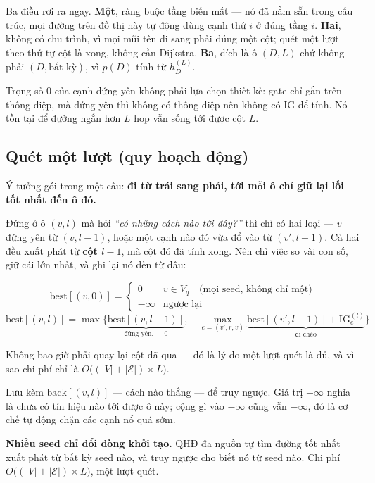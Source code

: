 \documentclass[11pt,a4paper]{article}
\newcommand{\best}{\mathrm{best}}
\begin{document}
Ba điều rơi ra ngay. \textbf{Một}, ràng buộc tầng biến mất --- nó đã nằm sẵn trong cấu trúc,
mọi đường trên đồ thị này tự động dùng cạnh thứ $i$ ở đúng tầng $i$. \textbf{Hai}, không có
chu trình, vì mọi mũi tên đi sang phải đúng một cột; quét một lượt theo thứ tự cột là xong,
không cần Dijkstra. \textbf{Ba}, đích là ô $(D,L)$ chứ không phải $(D,\text{bất kỳ})$, vì
$p(D)$ tính từ $h_D^{(L)}$.

Trọng số 0 của cạnh đứng yên không phải lựa chọn thiết kế: gate chỉ gắn trên thông điệp, mà
đứng yên thì không có thông điệp nên không có IG để tính. Nó tồn tại để đường ngắn hơn $L$
hop vẫn sống tới được cột $L$.

\subsection{Quét một lượt (quy hoạch động)}\label{sec:dp}

Ý tưởng gói trong một câu: \textbf{đi từ trái sang phải, tới mỗi ô chỉ giữ lại lối tốt nhất
đến ô đó.}

Đứng ở ô $(v,l)$ mà hỏi \emph{``có những cách nào tới đây?''} thì chỉ có hai loại --- $v$
đứng yên từ $(v,l-1)$, hoặc một cạnh nào đó vừa đổ vào từ $(v',l-1)$. Cả hai đều xuất phát
từ \textbf{cột $l-1$}, mà cột đó đã tính xong. Nên chỉ việc so vài con số, giữ cái lớn nhất,
và ghi lại nó đến từ đâu:

\[ \best[(v,0)]=\begin{cases}0 & v\in V_q \quad\text{(mọi seed, không chỉ một)}\\
                             -\infty & \text{ngược lại}\end{cases} \]
\[ \best[(v,l)]=\max\Big\{\underbrace{\best[(v,l-1)]}_{\text{đứng yên, }+0},\quad
   \max_{e=(v',r,v)}\underbrace{\best[(v',l-1)]+\mathrm{IG}_e^{(l)}}_{\text{đi chéo}}\Big\} \]

Không bao giờ phải quay lại cột đã qua --- đó là lý do một lượt quét là đủ, và vì sao chi
phí chỉ là $O\big((|V|+|\mathcal{E}|)\times L\big)$.

Lưu kèm $\mathrm{back}[(v,l)]$ --- cách nào thắng --- để truy ngược. Giá trị $-\infty$ nghĩa là chưa có tín hiệu nào tới được ô này; cộng gì vào $-\infty$ cũng vẫn $-\infty$, đó là cơ chế tự động chặn các cạnh nổ quá sớm.

\textbf{Nhiều seed chỉ đổi dòng khởi tạo.} QHĐ đa nguồn tự tìm đường tốt nhất xuất phát từ bất kỳ seed nào, và truy ngược cho biết nó từ seed nào. Chi phí $O\big((|V|+|\mathcal{E}|)\times L\big)$, một lượt quét.
\end{document}
